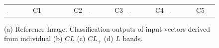 \begin{figure}[t]
\begin{subfigure}[b]{0.23\textwidth}
		\caption{}
		\label{fig:P}
	\end{subfigure}
	\begin{tabular}{lllllllllll}
		\includegraphics[width=0.01\textwidth]{Figures/Kron/Legend/Pea} & C1 & \includegraphics[width=0.01\textwidth]{Figures/Kron/Legend/Wheat} & C2 & \includegraphics[width=0.01\textwidth]{Figures/Kron/Legend/Rseed} & C3 & \includegraphics[width=0.01\textwidth]{Figures/Kron/Legend/Luc} & C4 &
		\includegraphics[width=0.01\textwidth]{Figures/Kron/Legend/Barley} & C5 &
	\end{tabular}
	\caption{(a) Reference Image.  Classification outputs of input vectors derived from individual (b) $CL$ (c) $CL_+$ (d) $L$ bands. }\label{fig:secondSet}
\end{figure}





































